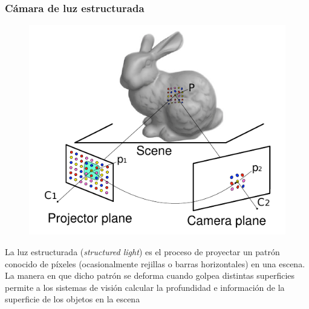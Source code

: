 \begin{frame}
    \frametitle{Cámara de luz estructurada}

    \begin{figure}[!h]
        \centering
        \includegraphics[width=0.5\columnwidth]{images/structured_light.pdf}
    \end{figure}

    La luz estructurada (\emph{structured light}) es el proceso de proyectar un patrón conocido de píxeles (ocasionalmente rejillas o barras horizontales) en una escena. La manera en que dicho patrón se deforma cuando golpea distintas superficies permite a los sistemas de visión calcular la profundidad e información de la superficie de los objetos en la escena
    

     
    
\end{frame}